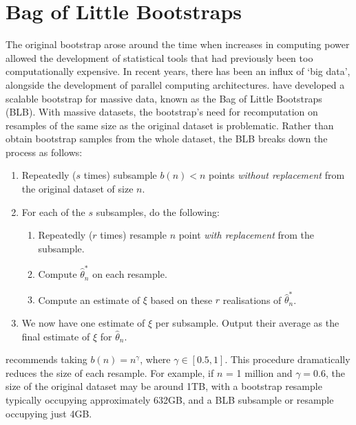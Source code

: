 \documentclass{article}\usepackage[]{graphicx}\usepackage[]{color}
\begin{document}


\section{Bag of Little Bootstraps}
The original bootstrap arose around the time when increases in computing power allowed the development of statistical tools that had previously been too computationally expensive. In recent years, there has been an influx of `big data', alongside the development of parallel computing architectures. \textcite{Kleiner2014} have developed a scalable bootstrap for massive data, known as the Bag of Little Bootstraps (BLB). With massive datasets, the bootstrap's need for recomputation on resamples of the same size as the original dataset is problematic. Rather than obtain bootstrap samples from the whole dataset, the BLB breaks down the process as follows:

\begin{enumerate}
\item Repeatedly ($s$ times) subsample $b(n) < n$ points \emph{without replacement} from the original dataset of size $n$.
\item For each of the $s$ subsamples, do the following:
\begin{enumerate}
\item Repeatedly ($r$ times) resample $n$ point \emph{with replacement} from the subsample.
\item Compute $\hat\theta_n^*$ on each resample.
\item Compute an estimate of $\xi$ based on these $r$ realisations of $\hat\theta_n^*$.
\end{enumerate}
\item We now have one estimate of $\xi$ per subsample. Output their average as the final estimate of $\xi$ for $\hat\theta_n$.
\end{enumerate}


\textcite{Kleiner2014} recommends taking $b(n) = n^{\gamma}$, where $\gamma \in [0.5,1]$. This procedure dramatically reduces the size of each resample. For example, if $n$ = 1 million and $\gamma=0.6$, the size of the original dataset may be around 1TB, with a bootstrap resample typically occupying approximately 632GB, and a BLB subsample or resample occupying just 4GB.
\end{document}
